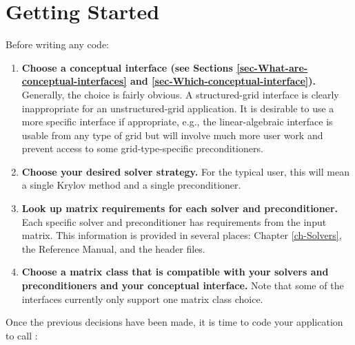 
\chapter{Getting Started}
\label{ch-Getting-Started}

Before writing any code:

\begin{enumerate}

\item
{\bf Choose a conceptual interface (see Sections
\ref{sec-What-are-conceptual-interfaces} and
\ref{sec-Which-conceptual-interface}).}
Generally, the choice is fairly obvious.  A structured-grid interface
is clearly inappropriate for an unstructured-grid application.  It is
desirable to use a more specific interface if appropriate, e.g., the
linear-algebraic interface is usable from any type of grid but will
involve much more user work and prevent access to some
grid-type-specific preconditioners.

\item 
{\bf Choose your desired solver strategy.}  For the typical user, this
will mean a single Krylov method and a single preconditioner.

\item 
{\bf Look up matrix requirements for each solver and preconditioner.}
Each specific solver and preconditioner has requirements from the
input matrix.  This information is provided in several places: Chapter
\ref{ch-Solvers}, the \hypre{} Reference Manual, and
the \hypre{} header files.

\item 
{\bf Choose a matrix class that is compatible with your solvers and
preconditioners and your conceptual interface.}  Note that some of the
interfaces currently only support one matrix class choice.

\end{enumerate}
Once the previous decisions have been made, it is time to code your
application to call \hypre{}:
